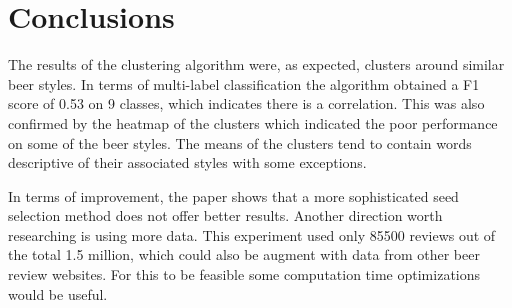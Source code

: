 \documentclass[12pt]{article}
\begin{document}
	\section{Conclusions}
	The results of the clustering algorithm were, as expected, clusters around similar beer styles. In terms of multi-label classification the algorithm obtained a F1 score of 0.53 on 9 classes, which indicates there is a correlation. This was also confirmed by the heatmap of the clusters which indicated the poor performance on some of the beer styles. The means of the clusters tend to contain words descriptive of their associated styles with some exceptions.
	
	In terms of improvement, the paper shows that a more sophisticated seed selection method does not offer better results. Another direction worth researching is using more data. This experiment used only 85500 reviews out of the total 1.5 million, which could also be augment with data from other beer review websites. For this to be feasible some computation time optimizations would be useful. 
	
	\newpage
	
	
\end{document}
